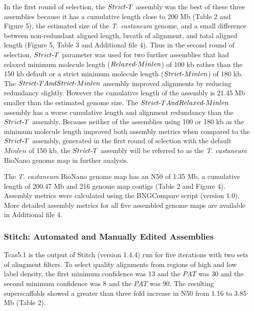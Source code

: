 \documentclass{bmcart}
\begin{document}
In the first round of selection, the $Strict\textnormal{-}T$ assembly was the best of these three assemblies because it has a cumulative length close to 200 Mb (Table 2 and Figure 5), the estimated size of the \textit{T. castaneum} genome, and a small difference between non-redundant aligned length, breath of alignment, and total aligned length (Figure 5, Table 3 and Additional file 4). Thus in the second round of selection, $Strict\textnormal{-}T$ parameter was used for two further assemblies that had relaxed minimum molecule length ($Relaxed\textnormal{-}Minlen$) of 100 kb rather than the 150 kb default or a strict minimum molecule length ($Strict\textnormal{-}Minlen$) of 180 kb. The $Strict\textnormal{-}TAndStrict\textnormal{-}Minlen$ assembly improved alignments by reducing redundancy slightly. However the cumulative length of the assembly is 21.45 Mb smaller than the estimated genome size. The $Strict\textnormal{-}TAndRelaxed\textnormal{-}Minlen$ assembly has a worse cumulative length and alignment redundancy than the $Strict\textnormal{-}T$ assembly. Because neither of the assemblies using 100 or 180 kb as the minimum molecule length improved both assembly metrics when compared to the $Strict\textnormal{-}T$ assembly, generated in the first round of selection with the default $Minlen$ of 150 kb, the $Strict\textnormal{-}T$ assembly will be referred to as the \textit{T. castaneum} BioNano genome map in further analysis.

The \textit{T. castaneum} BioNano genome map has an N50 of 1.35 Mb, a cumulative length of 200.47 Mb and 216 genome map contigs (Table 2 and Figure 4). Assembly metrics were calculated using the BNGCompare script (version 1.0). More detailed assembly metrics for all five assembled genome maps are available in Additional file 4.

\subsubsection*{Stitch: Automated and Manually Edited Assemblies}

Tcas5.1 is the output of Stitch (version 1.4.4) run for five iterations with two sets of alingment filters. To select quality alignments from regions of high and low label density, the first minimum confidence was 13 and the $PAT$ was 30 and the second minimum confidence was 8 and the $PAT$ was 90. The resulting superscaffolds showed a greater than three fold increase in N50 from 1.16 to 3.85 Mb (Table 2). 
\end{document}
